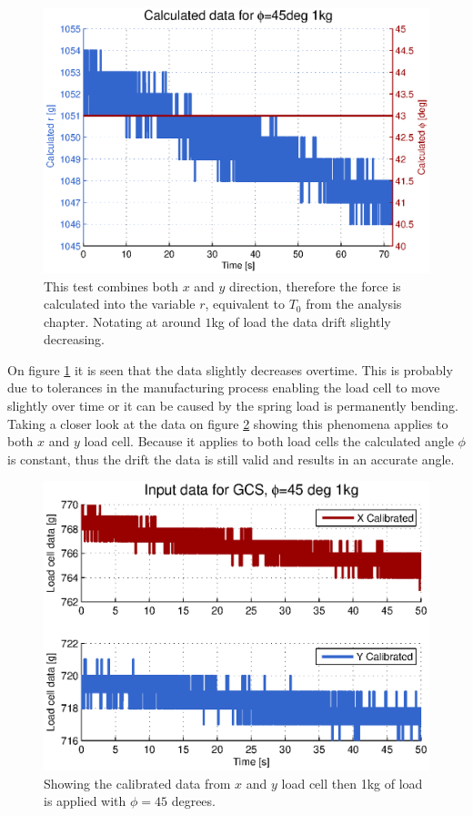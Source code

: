 \begin{figure}[hbtp]
\centering
\includegraphics[scale=0.8]{graphics/gcs_test/phi45deg1kg.eps}
\caption[Test combines both $x$ and $y$ direction]{This test combines both $x$ and $y$ direction, therefore the force is calculated into the variable $r$, equivalent to $T_0$ from the analysis chapter. Notating at around $1$kg of load the data drift slightly decreasing.}
\label{fig:phi45deg1kg}
\end{figure}

\newpage
\noindent
On figure \ref{fig:phi45deg1kg} it is seen that the data slightly decreases overtime. This is probably due to tolerances in the manufacturing process enabling the load cell to move slightly over time or it can be caused by the spring load is permanently bending. Taking a closer look at the data on figure \ref{fig:phi45deg1kgdata} showing this phenomena applies to both $x$ and $y$ load cell. Because it applies to both load cells the calculated angle $\phi$ is constant, thus the drift the data is still valid and results in an accurate angle.

\begin{figure}[hbtp]
\centering
\includegraphics[scale=0.8]{graphics/gcs_test/phi45deg1kgdata.eps}
\caption[Calibrated data from $x$ and $y$ load cell]{Showing the calibrated data from $x$ and $y$ load cell then 1kg of load is applied with $\phi=45$ degrees.}
\label{fig:phi45deg1kgdata}
\end{figure}


